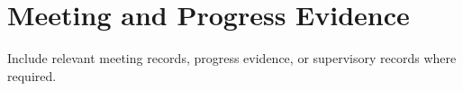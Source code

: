 \chapter{Meeting and Progress Evidence}
Include relevant meeting records, progress evidence, or supervisory records where required.
